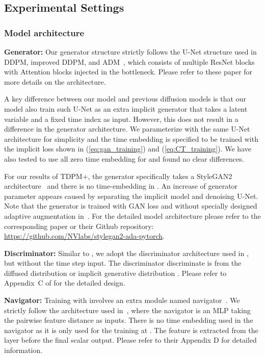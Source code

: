 \documentclass{article} \usepackage{iclr2023_conference,times}
\def\Eqref#1{(\ref{#1})}
\theoremstyle{plain}
\theoremstyle{definition}
\theoremstyle{remark}
\begin{document}
{\subsection{Experimental Settings}\label{appendix:experiments}

\subsubsection{Model architecture}
\textbf{Generator: }Our generator structure strictly follows the U-Net structure \citep{ronneberger2015u} used in DDPM, improved DDPM, and ADM~\citep{ddpm,nichol2021improved,Dhariwal2021DiffusionMB}, which consists of multiple ResNet blocks \citep{he2016deep} with Attention blocks \citep{vaswani2017attention} injected in the bottleneck. Please refer to these paper for more details on the architecture.

A key difference between our model and previous diffusion models is that our model also train such U-Net as an extra implicit generator  that takes a latent variable  and a fixed time index  as input. However, this does not result in a difference in the generator architecture. We parameterize  with the same U-Net architecture for simplicity and the time embedding  is specified to be trained with the implicit loss shown in \Eqref{eq:gan_training} and \Eqref{eq:CT_training}. We have also tested to use all zero time embedding for  and found no clear differences. 

For our results of TDPM+, the generator  specifically takes a StyleGAN2 architecture~\cite{karras2020analyzing} and there is no time-embedding in . An increase of generator parameter appears caused by separating the implicit model and denoising U-Net. Note that the generator is trained with GAN loss and without specially designed adaptive augmentation in~\citet{karras2020training}. For the detailed model architecture please refer to the corresponding paper or their Github repository: \url{https://github.com/NVlabs/stylegan2-ada-pytorch}.

\textbf{Discriminator:} Similar to \citet{xiao2021tackling}, we adopt the discriminator architecture used in \citet{karras2020analyzing}, but without the time step input. The discriminator discriminate  is from the diffused distribution  or implicit generative distribution . Please refer to Appendix~C of \citet{xiao2021tackling} for the detailed design.

\textbf{Navigator:} Training with  involves an extra module named navigator~\citep{zheng2021exploiting}. We strictly follow the architecture used in~\citet{zheng2021exploiting}, where the navigator is an MLP taking the pairwise feature distance as inputs. There is no time embedding used in the navigator as it is only used for the training at . The feature is extracted from the layer before the final scalar output. Please refer to their Appendix D for detailed information.

}
\end{document}
